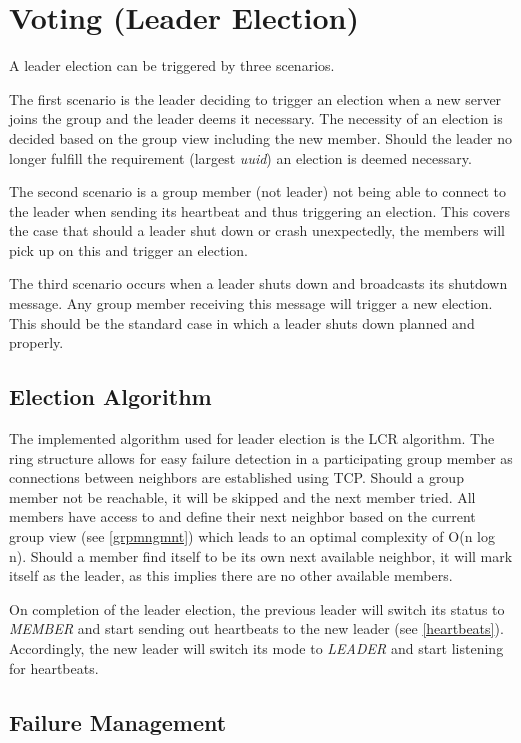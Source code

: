 \documentclass[runningheads]{llncs}
\begin{document}
\section{Voting (Leader Election)}

A leader election can be triggered by three scenarios.

The first scenario is the leader deciding to trigger an election when a new server joins the group and the leader deems it necessary. The necessity of an election is decided based on the group view including the new member. Should the leader no longer fulfill the requirement (largest \textit{uuid}) an election is deemed necessary.

The second scenario is a group member (not leader) not being able to connect to the leader when sending its heartbeat and thus triggering an election. This covers the case that should a leader shut down or crash unexpectedly, the members will pick up on this and trigger an election.

The third scenario occurs when a leader shuts down and broadcasts its shutdown message. Any group member receiving this message will trigger a new election. This should be the standard case in which a leader shuts down planned and properly.

\subsection{Election Algorithm}

The implemented algorithm used for leader election is the LCR algorithm. The ring structure allows for easy failure detection in a participating group member as connections between neighbors are established using TCP. Should a group member not be reachable, it will be skipped and the next member tried. All members have access to and define their next neighbor based on the current group view (see \ref{grpmngmnt}) which leads to an optimal complexity of O(n log n). Should a member find itself to be its own next available neighbor, it will mark itself as the leader, as this implies there are no other available members.

On completion of the leader election, the previous leader will switch its status to \textit{MEMBER} and start sending out heartbeats to the new leader (see \ref{heartbeats}). Accordingly, the new leader will switch its mode to \textit{LEADER} and start listening for heartbeats.

\subsection{Failure Management}
\end{document}
